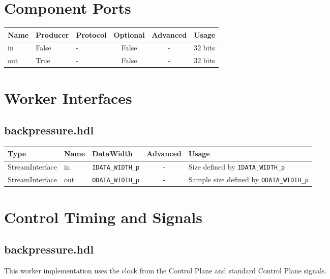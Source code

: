 \documentclass{article}
\def\comp{backpressure}
\begin{document}
\begin{landscape}
	\section*{Component Ports}
	\begin{scriptsize}
		\begin{tabular}{|M{2cm}|M{1.5cm}|M{4cm}|c|c|M{9cm}|}
			\hline
			Name & Producer & Protocol & Optional & Advanced & Usage                                  \\
			\hline
			in   & False    & -        & False    & -        & 32 bits                            \\
			\hline
			out  & True     & -        & False    & -        & 32 bits \\
			\hline
		\end{tabular}
	\end{scriptsize}

	\section*{Worker Interfaces}
	\subsection*{\comp.hdl}
	\begin{scriptsize}
		\begin{tabular}{|M{2cm}|M{1.5cm}|M{4cm}|c|M{12cm}|}
			\hline
			\rowcolor{blue}
			Type            & Name & DataWidth            & Advanced & Usage                                       \\
			\hline
			StreamInterface & in   & \verb+IDATA_WIDTH_p+ & -        & Size defined by \verb+IDATA_WIDTH_p+        \\
			\hline
			StreamInterface & out  & \verb+ODATA_WIDTH_p+ & -        & Sample size defined by \verb+ODATA_WIDTH_p+ \\
			\hline
		\end{tabular}
	\end{scriptsize}
\end{landscape}

\section*{Control Timing and Signals}
\subsection*{\comp.hdl}
\begin{flushleft}
	This worker implementation uses the clock from the Control Plane and standard Control Plane signals.
\end{flushleft}
\end{document}
